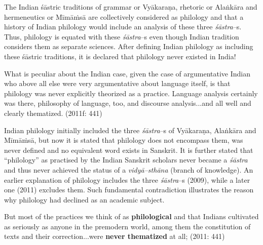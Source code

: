 The Indian śāstric traditions of grammar or Vyākaraṇa, rhetoric or Alaṅkāra and hermeneutics or Mīmāṁsā are collectively considered as philology and that a history of Indian philology would include an analysis of these three\textit{ śāstra}–s. Thus, philology is equated with these \textit{śāstra}–s even though Indian tradition considers them as separate sciences. After defining Indian philology as including these śāstric traditions, it is declared that philology never existed in India!

\begin{myquote}
What is peculiar about the Indian case, given the case of argumentative Indian who above all else were very argumentative about language itself, is that philology was never explicitly theorized as a practice. Language analysis certainly was there, philosophy of language, too, and discourse analysis...and all well and clearly thematized. (2011f: 441)
\end{myquote}

Indian philology initially included the three \textit{śāstra}–s of Vyākaraṇa, Alaṅkāra and Mīmāṁsā, but now it is stated that philology does not encompass them, was never defined and no equivalent word exists in Sanskrit. It is further stated that “philology” as practised by the Indian Sanskrit scholars never became a \textit{śāstra} and thus never achieved the status of a \textit{vidyā–sthāna} (branch of knowledge). An earlier explanation of philology includes the three \textit{śāstra}–s (2009), while a later one (2011) excludes them. Such fundamental contradiction illustrates the reason why philology had declined as an academic subject.

\newpage

\begin{myquote}
But most of the practices we think of as \textbf{philological} and that Indians cultivated as seriously as anyone in the premodern world, among them the constitution of texts and their correction...were \textbf{never thematized} at all; (2011: 441)
\end{myquote}

